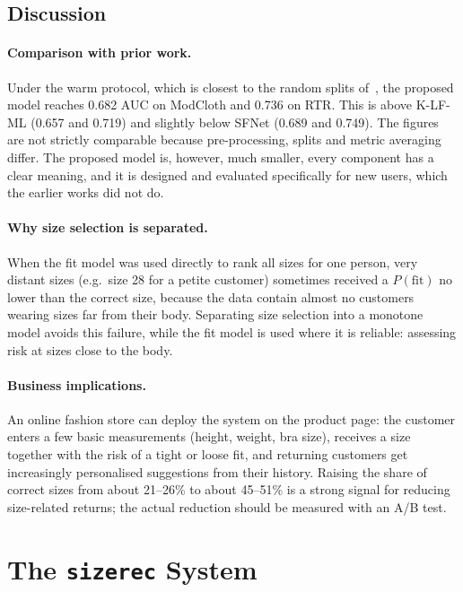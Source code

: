 \subsection{Discussion}
\paragraph{Comparison with prior work.} Under the warm protocol, which is closest to the random splits of~\cite{misra2018fit,sheikh2019sfnet}, the proposed model reaches 0.682 AUC on ModCloth and 0.736 on RTR. This is above K-LF-ML (0.657 and 0.719) and slightly below SFNet (0.689 and 0.749). The figures are not strictly comparable because pre-processing, splits and metric averaging differ. The proposed model is, however, much smaller, every component has a clear meaning, and it is designed and evaluated specifically for new users, which the earlier works did not do.

\paragraph{Why size selection is separated.} When the fit model was used directly to rank all sizes for one person, very distant sizes (e.g.\ size 28 for a petite customer) sometimes received a $P(\text{fit})$ no lower than the correct size, because the data contain almost no customers wearing sizes far from their body. Separating size selection into a monotone model avoids this failure, while the fit model is used where it is reliable: assessing risk at sizes close to the body.

\paragraph{Business implications.} An online fashion store can deploy the system on the product page: the customer enters a few basic measurements (height, weight, bra size), receives a size together with the risk of a tight or loose fit, and returning customers get increasingly personalised suggestions from their history. Raising the share of correct sizes from about 21--26\% to about 45--51\% is a strong signal for reducing size-related returns; the actual reduction should be measured with an A/B test.

\section{The \texttt{sizerec} System}\label{sec7}

